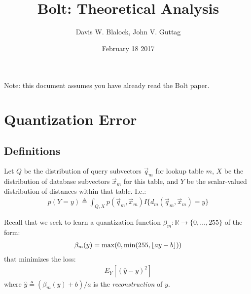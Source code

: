\documentclass[]{article}
\begin{document}
\title{Bolt: Theoretical Analysis}

\author{Davis W. Blalock, John V. Guttag}



\date{\Large February 18 2017}
\maketitle

Note: this document assumes you have already read the Bolt paper.

\section{Quantization Error}

\subsection{Definitions}

Let $Q$ be the distribution of query subvectors $\vec{q}_m$ for lookup table $m$, $X$ be the distribution of database subvectors $\vec{x}_m$ for this table, and $Y$ be the scalar-valued distribution of distances within that table. I.e.:
\begin{align}
    p(Y = y) \triangleq \int_{Q, X} p(\vec{q}_m, \vec{x}_m)I\{d_m(\vec{q}_m, \vec{x}_m) = y\}
\end{align}

Recall that we seek to learn a quantization function $\beta_m: \mathbb{R} \rightarrow \{0,\ldots,255\}$ of the form:
\begin{align}
    \beta_m(y) = \max(0, \min(255, \floor*{ay - b}))
\end{align}
\noindent that minimizes the loss:
\begin{align}
    E_Y[(\hat{y} - y)^2]
\end{align}
where $\hat{y} \triangleq (\beta_m(y) + b)/a$ is the \textit{reconstruction} of $y$.
\end{document}
